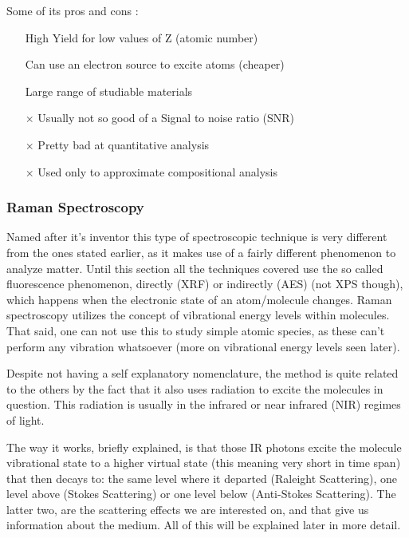 \documentclass[]{article}
\begin{document}
\newpage

Some of its pros and cons \cite{TH_Many}:
\begin{itemize}
\item[\checkmark] High Yield for low values of Z (atomic number)
\item[\checkmark] Can use an electron source to excite atoms (cheaper)
\item[\checkmark] Large range of studiable materials
\item[$\times$] Usually not so good of a Signal to noise ratio (SNR)
\item[$\times$] Pretty bad at quantitative analysis
\item[$\times$] Used only to approximate compositional analysis
\end{itemize}

\subsubsection{Raman Spectroscopy} \label{RMS}
Named after it's inventor this type of spectroscopic technique is very different from the ones stated earlier, as it makes use of a fairly different phenomenon to analyze matter. Until this section all the techniques covered use the so called fluorescence phenomenon, directly (XRF) or indirectly (AES) (not XPS though), which happens when the electronic state of an atom/molecule changes. Raman spectroscopy utilizes the concept of vibrational energy levels within molecules. That said, one can not use this to study simple atomic species, as these can't perform any vibration whatsoever (more on vibrational energy levels seen later).
\par Despite not having a self explanatory nomenclature, the method is quite related to the others by the fact that it also uses radiation to excite the molecules in question. This radiation is usually in the infrared or near infrared (NIR) regimes of light.
\par The way it works, briefly explained, is that those IR photons excite the molecule vibrational state to a higher virtual state (this meaning very short in time span) that then decays to: the same level where it departed (Raleight Scattering), one level above (Stokes Scattering) or one level below (Anti-Stokes Scattering). The latter two, are the scattering effects we are interested on, and that give us information about the medium. All of this will be explained later in more detail.\\
\end{document}
